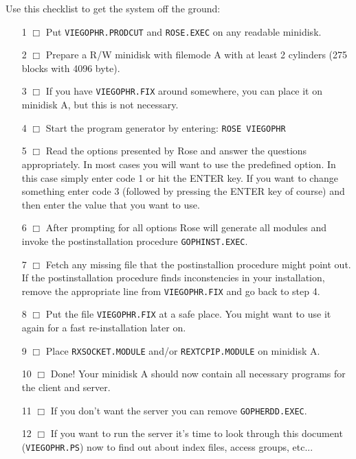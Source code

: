 \noindent
Use this checklist to get the system off the ground:
\begin{itemize}
\item[1 $\Box$] Put {\tt VIEGOPHR.PRODCUT} and {\tt ROSE.EXEC}
                on any readable minidisk.

\item[2 $\Box$] Prepare a R/W minidisk with filemode A with at
                least 2 cylinders (275 blocks with 4096 byte).

\item[3 $\Box$] If you have {\tt VIEGOPHR.FIX} around somewhere,
                you can place it on minidisk A, but this is not necessary.

\item[4 $\Box$] Start the program generator by entering:
                {\tt ROSE VIEGOPHR}

\item[5 $\Box$]  Read the options presented by {\sc Rose} and answer the questions
        appropriately.  In most cases you will want to use the
        predefined option.  In this case simply enter code 1 or hit
        the ENTER key.  If you want to change something enter code 3
        (followed by pressing the ENTER key of course) and then enter
        the value that you want to use.

\item[6 $\Box$]  After prompting for all options {\sc Rose} will generate all
        modules and invoke the postinstallation procedure {\tt GOPHINST.EXEC}.

\item[7 $\Box$]  Fetch any missing file that the postinstallion procedure might
        point out.  If the postinstallation procedure finds
        inconstencies in your installation, remove the appropriate
        line from {\tt VIEGOPHR.FIX} and go back to step 4.

\item[8 $\Box$]  Put the file {\tt VIEGOPHR.FIX} at a safe place.  You might want
        to use it again for a fast re-installation later on.

\item[9 $\Box$]  Place {\tt RXSOCKET.MODULE} and/or {\tt REXTCPIP.MODULE} on minidisk A.

\item[10 $\Box$]  Done!  Your minidisk A should now contain all necessary programs 
        for the client and server.

\item[11 $\Box$]  If you don't want the server you can remove {\tt GOPHERDD.EXEC}.

\item[12 $\Box$]  If you want to run the server it's time to look through
        this document ({\tt VIEGOPHR.PS}) now to find out about
        index files, access groups, etc...
\end{itemize}



